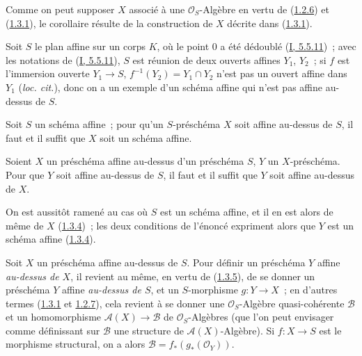 Comme on peut supposer $X$ associé à une $\mathcal{O}_S$-Algèbre en vertu de
(\hyperref[II.1.2.6-fr]{1.2.6}) et (\hyperref[II.1.3.1-fr]{1.3.1}), le
corollaire résulte de la construction de $X$ décrite dans
(\hyperref[II.1.3.1-fr]{1.3.1}).

\begin{example}[1.3.3]
\label{II.1.3.3-fr}
Soit $S$ le plan affine sur un corps $K$, où le point $0$ a été dédoublé
(\hyperref[I.5.5.11-fr]{I, 5.5.11})~; avec les notations de
(\hyperref[I.5.5.11-fr]{I, 5.5.11}), $S$ est réunion de deux ouverts affines
$Y_1$, $Y_2$~; si $f$ est l'immersion ouverte $Y_1\to S$,
$f^{-1}(Y_2)=Y_1\cap Y_2$ n'est pas un ouvert affine dans $Y_1$
(\emph{loc. cit.}), donc on a un exemple d'un schéma affine qui n'est pas
affine au-dessus de $S$.
\end{example}

\begin{corollary}[1.3.4]
\label{II.1.3.4-fr}
Soit $S$ un schéma affine~; pour qu'un $S$-préschéma $X$ soit affine au-dessus
de $S$, il faut et il suffit que $X$ soit un schéma affine.
\end{corollary}

\begin{corollary}[1.3.5]
\label{II.1.3.5-fr}
Soient $X$ un préschéma affine au-dessus d'un préschéma $S$, $Y$ un
$X$-préschéma. Pour que $Y$ soit affine au-dessus de $S$, il faut et il
suffit que $Y$ soit affine au-dessus de $X$.
\end{corollary}

On est aussitôt ramené au cas où $S$ est un schéma affine, et il en est alors
de même de $X$ (\hyperref[II.1.3.4-fr]{1.3.4})~; les deux conditions de
l'énoncé expriment alors que $Y$ est un schéma affine
(\hyperref[II.1.3.4-fr]{1.3.4}).

\begin{env}[1.3.6]
\label{II.1.3.6-fr}
Soit $X$ un préschéma affine au-dessus de $S$. Pour définir un préschéma $Y$
affine \emph{au-dessus de $X$}, il revient au même, en vertu de
(\hyperref[II.1.3.5-fr]{1.3.5}), de se donner un préschéma $Y$ affine
\emph{au-dessus de $S$}, et un $S$-morphisme $g:Y\to X$~; en d'autres termes
(\hyperref[II.1.3.1-fr]{1.3.1} et
\hyperref[II.1.2.7-fr]{1.2.7}), cela revient à se donner une
$\mathcal{O}_S$-Algèbre quasi-cohérente $\mathcal{B}$ et un homomorphisme
$\mathcal{A}(X)\to\mathcal{B}$ de $\mathcal{O}_S$-Algèbres (que l'on peut
envisager comme définissant sur $\mathcal{B}$ une structure de
$\mathcal{A}(X)$-Algèbre). Si $f:X\to S$ est le morphisme structural, on a
alors $\mathcal{B}=f_*(g_*(\mathcal{O}_Y))$.
\end{env}

